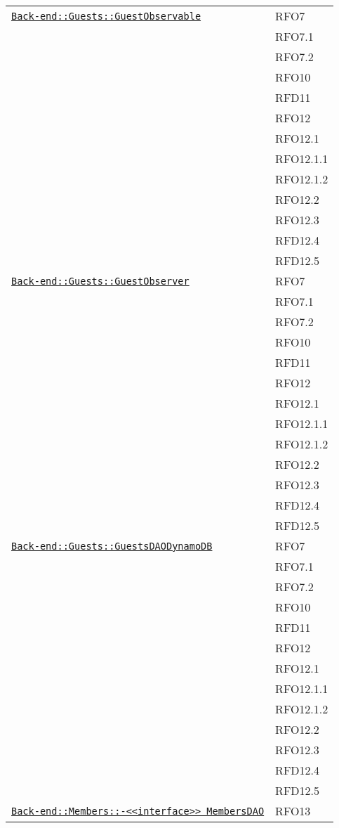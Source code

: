 \begin{longtable}{|>{\centering}m{10cm}|m{3cm}<{\centering}|}
\hyperref[Back-end::Guests::GuestObservable]{\texttt{Back-end::Guests::GuestObservable}} & RFO7\\
& RFO7.1\\
& RFO7.2\\
& RFO10\\
& RFD11\\
& RFO12\\
& RFO12.1\\
& RFO12.1.1\\
& RFO12.1.2\\
& RFO12.2\\
& RFO12.3\\
& RFD12.4\\
& RFD12.5\\ \hline

\hyperref[Back-end::Guests::GuestObserver]{\texttt{Back-end::Guests::GuestObserver}} & RFO7\\
& RFO7.1\\
& RFO7.2\\
& RFO10\\
& RFD11\\
& RFO12\\
& RFO12.1\\
& RFO12.1.1\\
& RFO12.1.2\\
& RFO12.2\\
& RFO12.3\\
& RFD12.4\\
& RFD12.5\\ \hline

\hyperref[Back-end::Guests::GuestsDAODynamoDB]{\texttt{Back-end::Guests::GuestsDAODynamoDB}} & RFO7\\
& RFO7.1\\
& RFO7.2\\
& RFO10\\
& RFD11\\
& RFO12\\
& RFO12.1\\
& RFO12.1.1\\
& RFO12.1.2\\
& RFO12.2\\
& RFO12.3\\
& RFD12.4\\
& RFD12.5\\ \hline

\hyperref[Back-end::Members::<<interface>> MembersDAO]{\texttt{Back-end::Members::-\linebreak <<interface>> MembersDAO}} & RFO13\\ \hline


\end{longtable}

